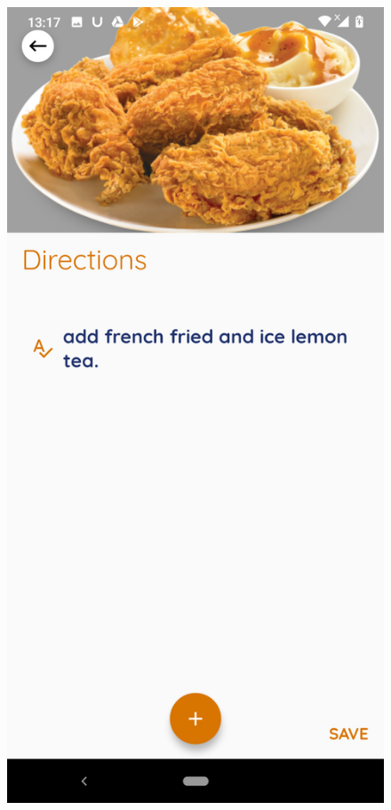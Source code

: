 \documentclass{article}
\begin{document}
\begin{figure}[h!]
    \includegraphics[scale=0.1]{Images/firechick_direc.jpg}

\end{figure}
\end{document}
